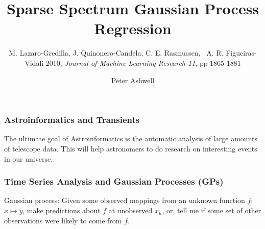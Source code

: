 \documentclass[12pt]{beamer}
\subtitle{M. Lazaro-Gredilla, J. Quinonero-Candela, C. E. Rasmussen, \
A. R. Figueiras-Vidali 2010, \emph{Journal of Machine Learning Research 11}, pp 1865-1881}
\title{Sparse Spectrum Gaussian Process Regression}
\date{}
\author{Peter Ashwell}
\begin{document}
\maketitle

\begin{frame}
	\frametitle{Astroinformatics and Transients}
	\begin{figure}
	  \centering
	\end{figure}
	The ultimate goal of Astroinformatics is the automatic analysis of large amounts of telescope data. This will help astronomers to do research on interesting events in our universe.

\end{frame}

\begin{frame}
	\frametitle{Time Series Analysis and Gaussian Processes (GPs)}
	\begin{figure}
		\captionsetup[subfigure]{labelformat=empty}
	\end{figure}
  Gaussian process: Given some observed mappings from an unknown function $f$: $x \mapsto y$, make predictions about $f$ at unobserved $x_{u}$, or, tell me if some set of other observations were likely to come from $f$.
\end{frame}
\end{document}
